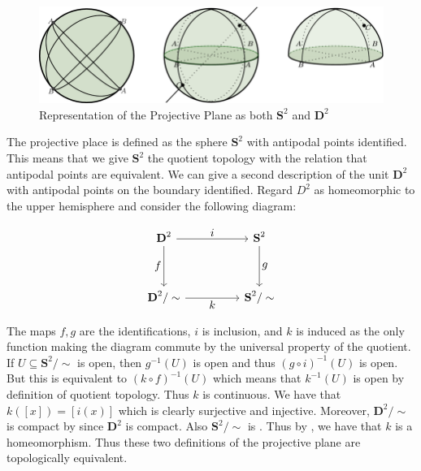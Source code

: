 \documentclass[letterpaper, 11pt, oneside]{book}
\begin{document}
\begin{ex}\
  \begin{figure}[h]
    \centering
    \includegraphics[width=\textwidth]{figs/Projective_Plane_Sphere_Disk.png}
    \caption{Representation of the Projective Plane as both $\textbf{S}^2$ and $\textbf{D}^{2}$~\cite{proj_plane_pic}}\label{fig:proj_plane}
    \nocite{proj_plane_pic}
  \end{figure}

  The projective place is defined as the sphere $\textbf{S}^{2}$ with antipodal points identified.
  This means that we give $\textbf{S}^{2}$ the quotient topology with the relation that antipodal points are equivalent.
  We can give a second description of the unit $\textbf{D}^{2}$ with antipodal points on the boundary identified.
  Regard $D^{2}$ as homeomorphic to the upper hemisphere and consider the following diagram:

  \begin{figure}[h]
    \centering
    \[
      \begin{tikzcd}[every label/.append style={font=\normalsize}]
        {\textbf{D}^2} && {\textbf{S}^2} \\
        \\
        {\textbf{D}^2/ \sim} && {\textbf{S}^2 / \sim}
        \arrow["i", from=1-1, to=1-3]
        \arrow["g", from=1-3, to=3-3]
        \arrow["k"', from=3-1, to=3-3]
        \arrow["f"', from=1-1, to=3-1]
      \end{tikzcd}
    \]
    \addtocounter{figure}{1}
  \end{figure}

  The maps $f, g$ are the identifications, $i$ is inclusion, and $k$ is induced as the only function making the diagram commute by the universal property of the quotient.
  If $U \subseteq \textbf{S}^{2} / \sim$ is open, then $g^{-1}(U)$ is open and thus $(g \circ i)^{-1}(U)$ is open.
  But this is equivalent to $(k \circ f)^{-1}(U)$ which means that $k^{-1}(U)$ is open by definition of quotient topology.
  Thus $k$ is continuous.
  We have that $k([x]) = [i(x)]$ which is clearly surjective and injective.
  Moreover, $\textbf{D}^{2} / \sim$ is compact by  since $\textbf{D}^{2}$ is compact.
  Also $\textbf{S}^{2} / \sim$ is .
  Thus by \Cref{thrm: bij_comp_to_Haus_is_homeo}, we have that $k$ is a homeomorphism.
  Thus these two definitions of the projective plane are topologically equivalent.
\end{ex}
\end{document}
